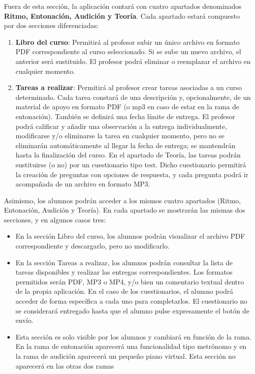 Fuera de esta sección, la aplicación contará con cuatro apartados denominados \textbf{Ritmo, Entonación, Audición y Teoría}. Cada apartado estará compuesto por dos secciones diferenciadas:
\begin{enumerate}
\item \textbf{Libro del curso}: Permitirá al profesor subir un único archivo en formato PDF correspondiente al curso seleccionado. Si se sube un nuevo archivo, el anterior será sustituido. El profesor podrá eliminar o reemplazar el archivo en cualquier momento.
\item \textbf{Tareas a realizar}: Permitirá al profesor crear tareas asociadas a un curso determinado. Cada tarea constará de una descripción y, opcionalmente, de un material de apoyo en formato PDF (o mp3 en caso de estar en la rama de entonación). También se definirá una fecha límite de entrega. El profesor podrá calificar y añadir una observación a la entrega individualmente, modificarse y/o eliminarse la tarea en cualquier momento, pero no se eliminarán automáticamente al llegar la fecha de entrega; se mantendrán hasta la finalización del curso. En el apartado de Teoría, las tareas podrán sustituirse (o no) por un cuestionario tipo test. Dicho cuestionario permitirá la creación de preguntas con opciones de respuesta, y cada pregunta podrá ir acompañada de un archivo en formato MP3.
\end{enumerate}

Asimismo, los alumnos podrán acceder a los mismos cuatro apartados (Ritmo, Entonación, Audición y Teoría). En cada apartado se mostrarán las mismas dos secciones, y en algunos casos tres:
\begin{itemize}
\item En la sección Libro del curso, los alumnos podrán visualizar el archivo PDF correspondiente y descargarlo, pero no modificarlo.
\item En la sección Tareas a realizar, los alumnos podrán consultar la lista de tareas disponibles y realizar las entregas correspondientes. Los formatos permitidos serán PDF, MP3 o MP4, y/o bien un comentario textual dentro de la propia aplicación. En el caso de los cuestionarios, el alumno podrá acceder de forma específica a cada uno para completarlos. El cuestionario no se considerará entregado hasta que el alumno pulse expresamente el botón de envío.
\item Esta sección es solo visible por los alumnos y cambiará en función de la rama. En la rama de entonación aparecerá una funcionalidad tipo metrónomo y en la rama de audición aparecerá un pequeño piano virtual. Esta sección no aparecerá en las otras dos ramas
\end{itemize}

